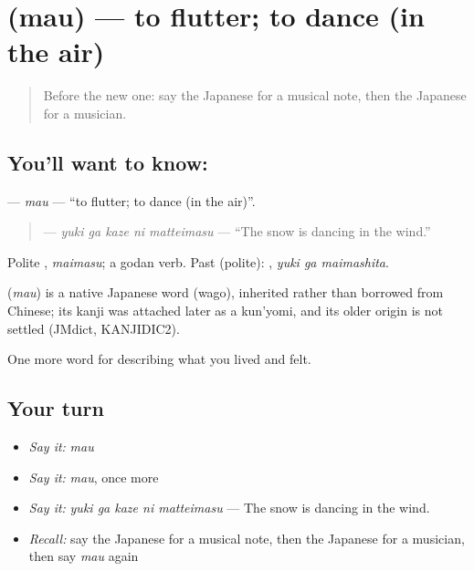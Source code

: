 \section[\texorpdfstring{\ja{まう} (mau)}{まう (mau)}]{ (mau) — to flutter; to dance (in the air)}

\label{lesson:JA-C503-mau}



\begin{quote}
Before the new one: say the Japanese for a musical note, then the Japanese for a musician.
\end{quote}

\subsection*{You'll want to know: }
\textbf{} — \emph{mau} — \textquotedblleft{}to flutter; to dance (in the air)\textquotedblright{}.

\begin{quote}
\textbf{  } — \emph{yuki ga kaze ni matteimasu} — \textquotedblleft{}The snow is dancing in the wind.\textquotedblright{}
\end{quote}

Polite \textbf{}, \emph{maimasu}; a godan verb. Past (polite): \textbf{ }, \emph{yuki ga maimashita}.

\begin{cousinweb}
\textbf{} (\emph{mau}) is a native Japanese word (wago), inherited rather than borrowed from Chinese; its kanji was attached later as a kun'yomi, and its older origin is not settled (JMdict, KANJIDIC2).
\end{cousinweb}

\begin{grammarlens}[title={What you've built}]
One more word for describing what you lived and felt.
\end{grammarlens}

\subsection*{Your turn}
\begin{itemize}
\raggedright
  \item \emph{Say it:} \emph{mau}
  \item \emph{Say it:} \emph{mau}, once more
  \item \emph{Say it:} \emph{yuki ga kaze ni matteimasu} — The snow is dancing in the wind.
  \item \emph{Recall:} say the Japanese for a musical note, then the Japanese for a musician, then say \emph{mau} again
\end{itemize}

